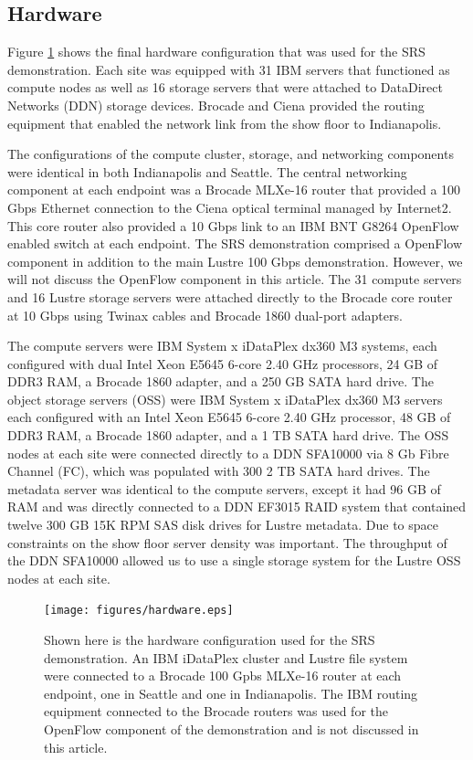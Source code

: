 \documentclass[]{sig-alternate}
\begin{document}
\subsection{Hardware}\label{sec:hardware}

Figure \ref{fig:hardwaresetup} shows the final hardware configuration that was used for the SRS
demonstration. Each site was equipped with 31 IBM servers that functioned as compute nodes as well as 16
storage servers that were attached to DataDirect Networks (DDN) storage devices. Brocade and Ciena provided
the routing equipment that enabled the network link from the show floor to Indianapolis.

The configurations of the compute cluster, storage, and networking components were identical in both
Indianapolis and Seattle. The central networking component at each endpoint was a Brocade MLXe-16 router that
provided a 100 Gbps Ethernet connection to the Ciena optical terminal managed by Internet2. This core router
also provided a 10 Gbps link to an IBM BNT G8264 OpenFlow enabled switch at each endpoint. The SRS
demonstration comprised a OpenFlow component in addition to the main Lustre 100 Gbps demonstration. However,
we will not discuss the OpenFlow component in this article. The 31 compute servers and 16 Lustre storage
servers were attached directly to the Brocade core router at 10 Gbps using Twinax cables and Brocade 1860
dual-port adapters.

The compute servers were IBM System x iDataPlex dx360 M3 systems, each configured with dual Intel Xeon E5645
6-core 2.40 GHz processors, 24 GB of DDR3 RAM, a Brocade 1860 adapter, and a 250 GB SATA hard drive. The
object storage servers (OSS) were IBM System x iDataPlex dx360 M3 servers each configured with an Intel Xeon
E5645 6-core 2.40 GHz processor, 48 GB of DDR3 RAM, a Brocade 1860 adapter, and a 1 TB SATA hard drive. The
OSS nodes at each site were connected directly to a DDN SFA10000 via 8 Gb Fibre Channel (FC), which was
populated with 300 2 TB SATA hard drives. The metadata server was identical to the compute servers, except it
had 96 GB of RAM and was directly connected to a DDN EF3015 RAID system that contained twelve 300 GB 15K RPM
SAS disk drives for Lustre metadata. Due to space constraints on the show floor server density was
important. The throughput of the DDN SFA10000 allowed us to use a single storage system for the Lustre OSS
nodes at each site.

\begin{figure}[t]
\begin{center}
\texttt{[image: figures/hardware.eps]}
\caption{Shown here is the hardware configuration used for the SRS demonstration. An IBM iDataPlex cluster and
  Lustre file system were connected to a Brocade 100 Gpbs MLXe-16 router at each endpoint, one in Seattle and
  one in Indianapolis. The IBM routing equipment connected to the Brocade routers was used for the OpenFlow component of the demonstration and is not discussed in this article. }
\label{fig:hardwaresetup}
\end{center}
\end{figure}
\end{document}
